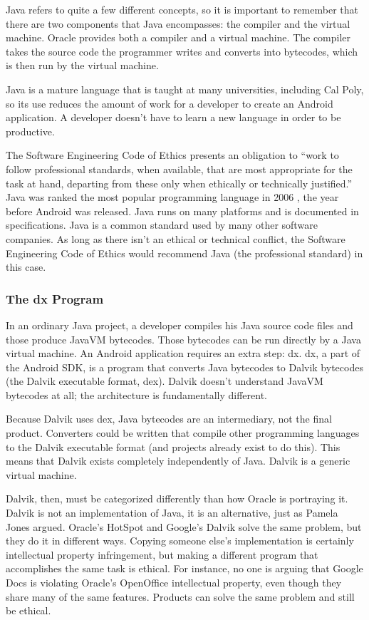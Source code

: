 \documentclass[11pt]{article}
\begin{document}
\begin{multicols}{2}
Java refers to quite a few different concepts, so it is important to remember
that there are two components that Java encompasses: the compiler and the
virtual machine.  Oracle provides both a compiler and a virtual machine.  The
compiler takes the source code the programmer writes and converts into
bytecodes, which is then run by the virtual machine.

Java is a mature language that is taught at many universities, including Cal
Poly, so its use reduces the amount of work for a developer to create an Android
application.  A developer doesn't have to learn a new language in order to be
productive.

The Software Engineering Code of Ethics presents an obligation to
``work to follow professional standards, when available, that are most
appropriate for the task at hand, departing from these only when ethically or
technically justified.'' \cite[\S 3.06]{secode}  Java was ranked the most
popular programming language in 2006 \cite[Long term trends]{tiobe}, the year
before Android was released.  Java runs on many platforms and is documented in
specifications.  Java is a common standard used by many other software
companies.  As long as there isn't an ethical or technical conflict, the
Software Engineering Code of Ethics would recommend Java (the professional
standard) in this case.

\subsubsection{The dx Program} %
\label{ssub:dex}

In an ordinary Java project, a developer compiles his Java source code files and
those produce JavaVM bytecodes.  Those bytecodes can be run directly by
a Java virtual machine.  An Android application requires an extra step: dx.
dx, a part of the Android SDK, is a program that converts Java bytecodes to
Dalvik bytecodes (the Dalvik executable format, dex).  Dalvik doesn't understand JavaVM
bytecodes at all; the architecture is fundamentally different.

Because Dalvik uses dex, Java bytecodes are an intermediary, not the final
product.  Converters could be written that compile other programming languages
to the Dalvik executable format (and projects already exist to do this).  This
means that Dalvik exists completely independently of Java.  Dalvik is a generic
virtual machine.

Dalvik, then, must be categorized differently than how Oracle is portraying it.
Dalvik is not an implementation of Java, it is an alternative, just as Pamela
Jones argued. \cite{groklaw}  Oracle's HotSpot and Google's Dalvik solve the
same problem, but they do it in different ways.  Copying someone else's
implementation is certainly intellectual property infringement, but making a
different program that accomplishes the same task is ethical.  For instance, no
one is arguing that Google Docs is violating Oracle's OpenOffice intellectual
property, even though they share many of the same features.  Products can solve
the same problem and still be ethical.


\end{multicols}
\end{document}
